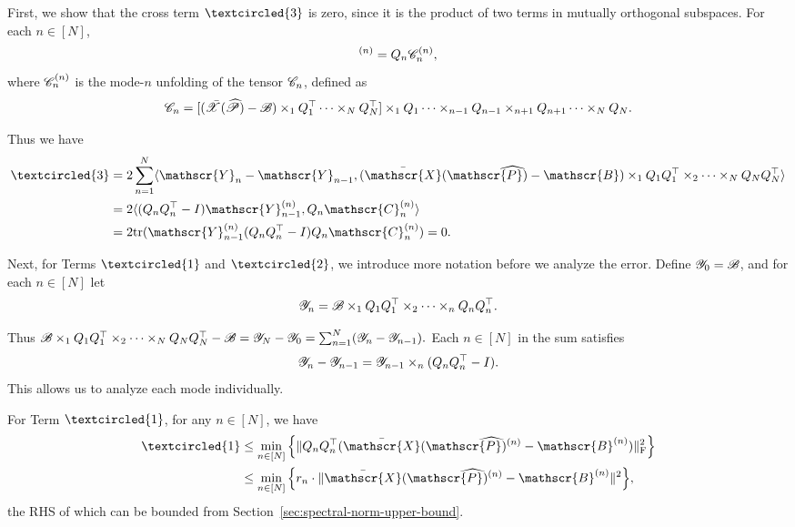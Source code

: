 \documentclass{article}
\newcommand{\T}[2][]{#1\mathscr{\MakeUppercase{#2}}}
\newcommand{\norm}[1]{\Vert #1 \Vert}
\newcommand{\fnorm}[1]{\norm{#1}_{\mathrm{F}}}
\def\Ph{\widehat P}
\theoremstyle{plain}
\begin{document}
First, we show that the cross term $\textcircled{3}$ is zero, since it is the product of two terms in mutually orthogonal subspaces. 
For each $n \in [N]$,
\begin{equation}
	[(\bar{\T{X}}(\T{\Ph})-\T{B}) \times_1 Q_1 Q_1^\top \times_2 \cdots \times_N Q_N Q_N^\top]^{(n)} = Q_{n} \T{C}_n^{(n)},
	\nonumber
\end{equation}
where $\T{C}_n^{(n)}$ is the mode-$n$ unfolding of the tensor $\T{C}_n$, defined as
\begin{equation}
	\T{C}_n = [(\bar{\T{X}}(\T{\Ph})-\T{B})\times_1 Q_1^\top \cdots \times_N Q_N^\top]
	\times_1 Q_1 \dots \times_{n-1} Q_{n-1} \times_{n+1}  Q_{n+1} \dots \times_N Q_{N}.
	\nonumber
\end{equation}

Thus we have
\begin{equation}
	\begin{aligned}
		\textcircled{3} & =2 \sum_{n=1}^{N} \langle \T{Y}_{n} - \T{Y}_{n-1}, (\bar{\T{X}}(\T{\Ph})-\T{B}) \times_1 Q_1Q_1^\top \times_2 \cdots \times_N Q_N Q_N^\top\rangle \\
		& = 2\langle (Q_{n} Q^\top_{n} - I) \T{Y}_{n-1}^{(n)}, Q_{n} \T{C}_n^{(n)}\rangle \\
		& = 2 \mathrm{tr}(\T{Y}_{n-1}^{(n)} (Q_{n} Q^\top_{n} - I)Q_{n} \T{C}_n^{(n)} )=0 .
	\end{aligned}
	\nonumber
\end{equation}

Next, for Terms $\textcircled{1}$ and $\textcircled{2}$, we introduce more notation before we analyze the error.
Define $\T{Y}_0 = \T{B}$, and for each $n \in [N]$ let
\begin{equation}
	\label{eq:definition_Y_n}
	\T{Y}_n = \T{B} \times_1 Q_1 Q_1^\top \times_2 \cdots \times_n Q_n Q_n^\top.
	\nonumber
\end{equation}

Thus $\T{B} \times_1 Q_1Q_1^\top \times_2 \cdots \times_N Q_N Q_N^\top - \T{B} = \T{Y}_N - \T{Y}_0 = \sum_{n=1}^{N} (\T{Y}_n - \T{Y}_{n-1}).$
Each $n \in [N]$ in the sum satisfies
\begin{equation}
	\T{Y}_{n} - \T{Y}_{n-1} = \T{Y}_{n-1} \times_{n} (Q_{n} Q^\top_{n} - I).
	\nonumber
\end{equation}
This allows us to analyze each mode individually. 


For Term $\textcircled{1}$, for any $n \in [N]$, we have
\begin{equation}
	\begin{aligned}
		\textcircled{1} & \leq \min_{n \in [N]} \Big\{\fnorm{Q_n Q_n^\top (\bar{\T{X}}(\T{\Ph})^{(n)} - \T{B}^{(n)})}^2 \Big\}\\
		& \leq \min_{n \in [N]} \Big\{r_n \cdot \norm{\bar{\T{X}}(\T{\Ph})^{(n)} - \T{B}^{(n)}}^2 \Big\},\\
	\end{aligned}
	\nonumber
\end{equation}
the RHS of which can be bounded from Section~\ref{sec:spectral-norm-upper-bound}.
\end{document}
